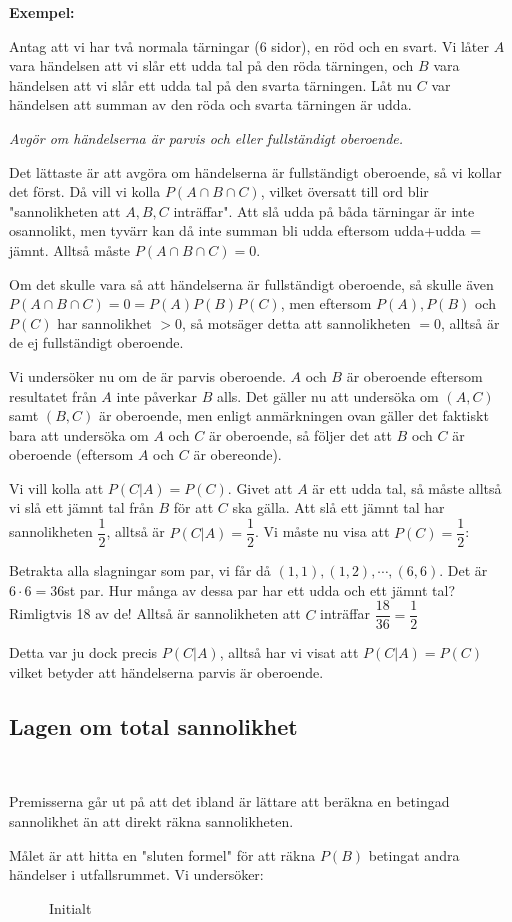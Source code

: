 \noindent\textbf{Exempel:}\par
\noindent Antag att vi har två normala tärningar (6 sidor), en röd och en svart. Vi låter $A$ vara händelsen att vi slår ett udda tal på den röda tärningen, och $B$ vara händelsen att vi slår ett udda tal på den svarta tärningen. Låt nu $C$ var händelsen att summan av den röda och svarta tärningen är udda.\par
\noindent\textit{Avgör om händelserna är parvis och eller fullständigt oberoende.}
\par\bigskip
\noindent Det lättaste är att avgöra om händelserna är fullständigt oberoende, så vi kollar det först. Då vill vi kolla $P(A\cap B\cap C)$, vilket översatt till ord blir "sannolikheten att $A,B,C$ inträffar". Att slå udda på båda tärningar är inte osannolikt, men tyvärr kan då inte summan bli udda eftersom udda+udda = jämnt. Alltså måste $P(A\cap B\cap C) = 0$.\par
\noindent Om det skulle vara så att händelserna är fullständigt oberoende, så skulle även $P(A\cap B\cap C) = 0 = P(A)P(B)P(C)$, men eftersom $P(A), P(B)$ och $P(C)$ har sannolikhet $>0$, så motsäger detta att sannolikheten $=0$, alltså är de ej fullständigt oberoende.
\par\bigskip
\noindent Vi undersöker nu om de är parvis oberoende. $A$ och $B$ är oberoende eftersom resultatet från $A$ inte påverkar $B$ alls. Det gäller nu att undersöka om $(A,C)$ samt $(B,C)$ är oberoende, men enligt anmärkningen ovan gäller det faktiskt bara att undersöka om $A$ och $C$ är oberoende, så följer det att $B$ och $C$ är oberoende (eftersom $A$ och $C$ är obereonde).\par
\noindent Vi vill kolla att $P(C|A) = P(C)$. Givet att $A$ är ett udda tal, så måste alltså vi slå ett jämnt tal från $B$ för att $C$ ska gälla. Att slå ett jämnt tal har sannolikheten $\dfrac{1}{2}$, alltså är $P(C|A) = \dfrac{1}{2}$. Vi måste nu visa att $P(C) = \dfrac{1}{2}$:\par
\noindent Betrakta alla slagningar som par, vi får då $(1,1),(1,2),\cdots,(6,6)$. Det är $6\cdot6=36$st par. Hur många av dessa par har ett udda och ett jämnt tal? Rimligtvis 18 av de! Alltså är sannolikheten att $C$ inträffar $\dfrac{18}{36} = \dfrac{1}{2}$\par
\noindent Detta var ju dock precis $P(C|A)$, alltså har vi visat att $P(C|A) = P(C)$ vilket betyder att händelserna parvis är oberoende.
\par\bigskip
\subsection{Lagen om total sannolikhet}\hfill\\\par
\noindent Premisserna går ut på att det ibland är lättare att beräkna en betingad sannolikhet än att direkt räkna sannolikheten.\par
\noindent Målet är att hitta en "sluten formel" för att räkna $P(B)$ betingat andra händelser i utfallsrummet. Vi undersöker:\par
\begin{figure}[ht]
    \centering
    \caption{Initialt}
    \label{fig:initialt}
\end{figure}
